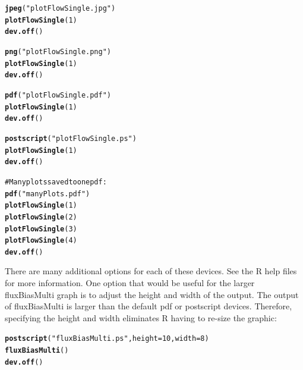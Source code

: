 \documentclass[a4paper,11pt]{article}\usepackage{graphicx, color}
\makeatletter
\newcommand{\hlfunctioncall}[1]{\textcolor[rgb]{0.501960784313725,0,0.329411764705882}{\textbf{#1}}}%
\newcommand{\hlstring}[1]{\textcolor[rgb]{0.6,0.6,1}{#1}}%
\newcommand{\hlcomment}[1]{\textcolor[rgb]{0.180392156862745,0.6,0.341176470588235}{#1}}%
\newenvironment{kframe}{%
 \def\at@end@of@kframe{}%
 \ifinner\ifhmode%
  \def\at@end@of@kframe{\end{minipage}}%
  \begin{minipage}{\columnwidth}%
 \fi\fi%
 \def\FrameCommand##1{\hskip\@totalleftmargin \hskip-\fboxsep
 \colorbox{shadecolor}{##1}\hskip-\fboxsep
     \hskip-\linewidth \hskip-\@totalleftmargin \hskip\columnwidth}%
 \MakeFramed {\advance\hsize-\width
   \@totalleftmargin\z@ \linewidth\hsize
   \@setminipage}}%
 {\par\unskip\endMakeFramed%
 \at@end@of@kframe}
\newenvironment{knitrout}{}{} %
\makeatother
\begin{document}
\begin{knitrout}
\color{fgcolor}\begin{kframe}
\begin{alltt}
\hlfunctioncall{jpeg}(\hlstring{"plotFlowSingle.jpg"})
\hlfunctioncall{plotFlowSingle}(1)
\hlfunctioncall{dev.off}()

\hlfunctioncall{png}(\hlstring{"plotFlowSingle.png"})
\hlfunctioncall{plotFlowSingle}(1)
\hlfunctioncall{dev.off}()

\hlfunctioncall{pdf}(\hlstring{"plotFlowSingle.pdf"})
\hlfunctioncall{plotFlowSingle}(1)
\hlfunctioncall{dev.off}()

\hlfunctioncall{postscript}(\hlstring{"plotFlowSingle.ps"})
\hlfunctioncall{plotFlowSingle}(1)
\hlfunctioncall{dev.off}()

\hlcomment{#Many plots saved to one pdf:}
\hlfunctioncall{pdf}(\hlstring{"manyPlots.pdf"})
\hlfunctioncall{plotFlowSingle}(1)
\hlfunctioncall{plotFlowSingle}(2)
\hlfunctioncall{plotFlowSingle}(3)
\hlfunctioncall{plotFlowSingle}(4)
\hlfunctioncall{dev.off}()

\end{alltt}
\end{kframe}
\end{knitrout}


There are many additional options for each of these devices. See the R help files for more information. One option that would be useful for the larger fluxBiasMulti graph is to adjust the height and width of the output. The output of fluxBiasMulti is larger than the default pdf or postscript devices. Therefore, specifying the height and width eliminates R having to re-size the graphic:

\begin{knitrout}
\color{fgcolor}\begin{kframe}
\begin{alltt}
\hlfunctioncall{postscript}(\hlstring{"fluxBiasMulti.ps"}, height=10,width=8)
\hlfunctioncall{fluxBiasMulti}()
\hlfunctioncall{dev.off}()
\end{alltt}
\end{kframe}
\end{knitrout}
\end{document}
